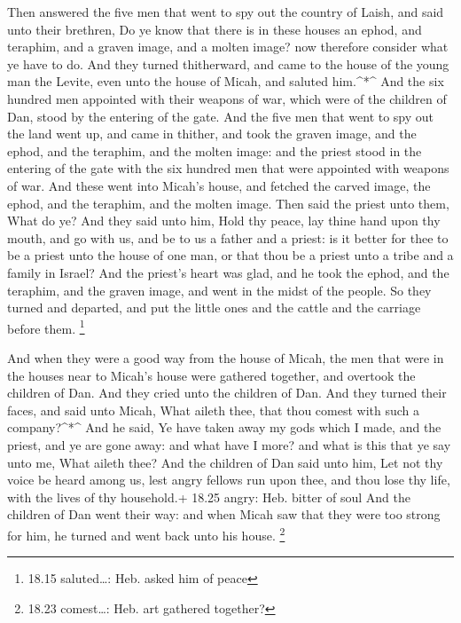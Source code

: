  Then answered the five men that went to spy out the
country of Laish, and said unto their brethren, Do ye know that there is
in these houses an ephod, and teraphim, and a graven image, and a molten
image? now therefore consider what ye have to do.  And they
turned thitherward, and came to the house of the young man the Levite,
even unto the house of Micah, and saluted him.\^{}*\^{} 
And the six hundred men appointed with their weapons of war, which were
of the children of Dan, stood by the entering of the gate. 
And the five men that went to spy out the land went up, and came in
thither, and took the graven image, and the ephod, and the teraphim, and
the molten image: and the priest stood in the entering of the gate with
the six hundred men that were appointed with weapons of war.
 And these went into Micah's house, and fetched the carved
image, the ephod, and the teraphim, and the molten image. Then said the
priest unto them, What do ye?  And they said unto him, Hold
thy peace, lay thine hand upon thy mouth, and go with us, and be to us a
father and a priest: is it better for thee to be a priest unto the house
of one man, or that thou be a priest unto a tribe and a family in
Israel?  And the priest's heart was glad, and he took the
ephod, and the teraphim, and the graven image, and went in the midst of
the people.  So they turned and departed, and put the
little ones and the cattle and the carriage before them. \footnote{18.15
  saluted\ldots: Heb. asked him of peace}

 And when they were a good way from the house of Micah, the
men that were in the houses near to Micah's house were gathered
together, and overtook the children of Dan.  And they cried
unto the children of Dan. And they turned their faces, and said unto
Micah, What aileth thee, that thou comest with such a company?\^{}*\^{}
 And he said, Ye have taken away my gods which I made, and
the priest, and ye are gone away: and what have I more? and what is this
that ye say unto me, What aileth thee?  And the children of
Dan said unto him, Let not thy voice be heard among us, lest angry
fellows run upon thee, and thou lose thy life, with the lives of thy
household.+ 18.25 angry: Heb. bitter of soul  And the
children of Dan went their way: and when Micah saw that they were too
strong for him, he turned and went back unto his house. \footnote{18.23
  comest\ldots: Heb. art gathered together?}

